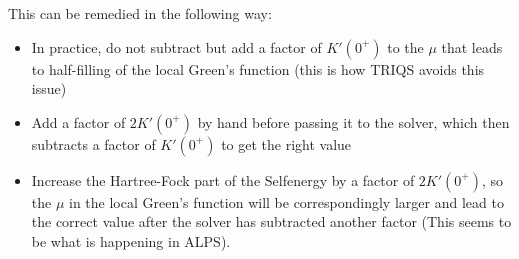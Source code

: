 \documentclass[12pt,a4paper]{scrartcl}
\numberwithin{equation}{section}
\begin{document}
\bigskip
This can be remedied in the following way:
\begin{itemize}
\item In practice, do not subtract but add a factor of $K'(0^+)$
to the $\mu$ that leads to half-filling of the local Green's function
(this is how TRIQS avoids this issue)
\item Add a factor of $2K'(0^+)$ by hand before passing it to the solver, which then subtracts
a factor of $K'(0^+)$ to get the right value
\item Increase the Hartree-Fock part of the Selfenergy by a factor of $2K'(0^+)$,
so the $\mu$ in the local Green's function will be correspondingly larger and lead to
the correct value after the solver has subtracted another factor
(This seems to be what is happening in ALPS).
\end{itemize}

 
\end{document}
